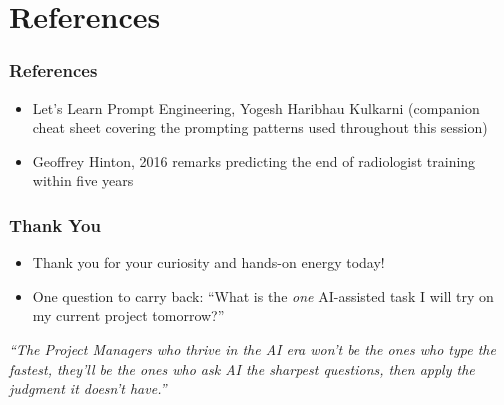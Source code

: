 \section[Refs]{References}
\begin{frame}[fragile]\frametitle{References}

\begin{itemize}
  \item Let's Learn Prompt Engineering, Yogesh Haribhau Kulkarni (companion cheat sheet covering the prompting patterns used throughout this session)
  \item Geoffrey Hinton, 2016 remarks predicting the end of radiologist training within five years
\end{itemize}

\end{frame}

\begin{frame}[fragile]\frametitle{Thank You}

\begin{itemize}
  \item Thank you for your curiosity and hands-on energy today!
  \item One question to carry back: ``What is the \textit{one} AI-assisted task I will try on my current project tomorrow?''
\end{itemize}

\vspace{0.5em}
\begin{center}
\textit{``The Project Managers who thrive in the AI era won't be the ones who type the fastest, they'll be the ones who ask AI the sharpest questions, then apply the judgment it doesn't have.''}
\end{center}

\end{frame}
